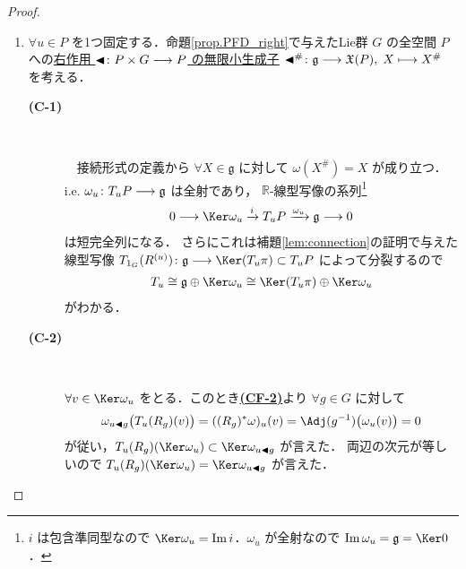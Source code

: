 \documentclass[geometry_main]{subfiles}
\begin{document}
\begin{proof}
    \begin{enumerate}
        \item 
        $\forall u \in P$ を1つ固定する．命題\ref{prop.PFD_right}で与えたLie群 $G$ の全空間 $P$ への\hyperref[def:fundamental-vecf]{右作用 $\blacktriangleleft \colon P \times G \longrightarrow P$ の無限小生成子} $\blacktriangleleft^\# \colon \mathfrak{g} \longrightarrow \mathfrak{X}(P),\; X \longmapsto X^\#$ を考える．
        \begin{description}
            \item[\textbf{(C-1)}]　
            
            　接続形式の定義から $\forall X \in \mathfrak{g}$ に対して $\omega (X^\#) = X$ が成り立つ．i.e. $\omega_{u} \colon T_{u}P \longrightarrow \mathfrak{g}$ は全射であり，
            $\mathbb{R}$-線型写像の系列\footnote{$i$ は包含準同型なので $\Ker \omega_{u} = \Im i$．$\omega_{u}$ が全射なので $\Im \omega_{u} = \mathfrak{g} = \Ker 0$．}
            \begin{align}
                0 \lto \Ker \omega_{u} \xrightarrow{i} T_{u} P \xrightarrow{\omega_{u}} \mathfrak{g} \lto 0
            \end{align}
            は短完全列になる．
            さらにこれは補題\ref{lem:connection}の証明で与えた線型写像 $T_{1_G} (R^{(u)}) \colon \mathfrak{g} \lto \Ker (T_{u} \pi) \subset T_{u}P$ によって分裂するので
            \begin{align}
                T_{u} \cong \mathfrak{g} \oplus \Ker \omega_{u} \cong \Ker (T_{u} \pi) \oplus \Ker \omega_{u}
            \end{align}
            がわかる．

            \item[\textbf{(C-2)}]　
            
            $\forall v \in \Ker \omega_{u}$ をとる．このとき\hyperref[def:connection]{\textbf{\textsf{(CF-2)}}}より $\forall g \in G$ に対して
            \begin{align}
                \omega_{u \btl g} \bigl( T_{u}(R_g)(v) \bigr) = ((R_g)^* \omega)_{u} (v) = \Adj (g^{-1})\bigl(\omega_{u}(v)\bigr) = 0
            \end{align}
            が従い，$T_{u}(R_g)(\Ker \omega_{u}) \subset \Ker \omega_{u \btl g}$ が言えた．
            両辺の次元が等しいので $T_u(R_g)(\Ker \omega_u) = \Ker \omega_{u \btl g}$ が言えた．
        \end{description}


\end{enumerate}
\end{proof}
\end{document}
